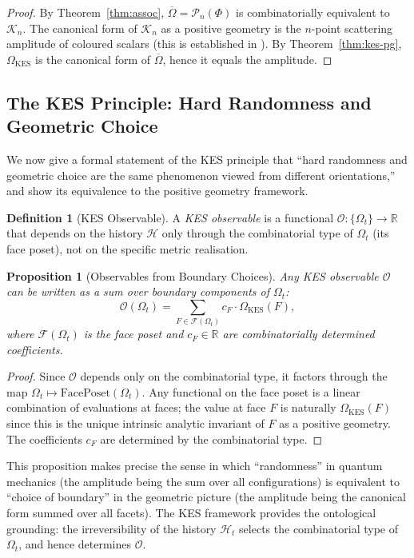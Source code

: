 \documentclass[12pt, oneside]{amsart}
\theoremstyle{plain}
\newtheorem{proposition}[theorem]{Proposition}
\theoremstyle{definition}
\newtheorem{definition}[theorem]{Definition}
\theoremstyle{remark}
\newcommand{\R}{\mathbb{R}}
\newcommand{\OmKS}{\Omega}
\newcommand{\HKS}{\mathcal{H}}
\newcommand{\Assoc}{\mathcal{K}_n}
\newcommand{\CF}{\Omega}   %
\begin{document}
\begin{proof}
By Theorem~\ref{thm:assoc}, $\overline{\OmKS} = \mathcal{P}_n(\Phi)$ is combinatorially equivalent to $\Assoc$. The canonical form of $\Assoc$ as a positive geometry is the $n$-point scattering amplitude of coloured scalars (this is established in \cite{ABHY2018}). By Theorem~\ref{thm:kes-pg}, $\CF_{\text{KES}}$ is the canonical form of $\overline{\OmKS}$, hence it equals the amplitude.
\end{proof}

\subsection{The KES Principle: Hard Randomness and Geometric Choice}

We now give a formal statement of the KES principle that ``hard randomness and geometric choice are the same phenomenon viewed from different orientations,'' and show its equivalence to the positive geometry framework.

\begin{definition}[KES Observable]
\label{def:kes-observable}
A \emph{KES observable} is a functional $\mathcal{O}: \{\OmKS_t\} \to \R$ that depends on the history $\HKS$ only through the combinatorial type of $\OmKS_t$ (its face poset), not on the specific metric realisation.
\end{definition}

\begin{proposition}[Observables from Boundary Choices]
\label{prop:boundary-choice}
Any KES observable $\mathcal{O}$ can be written as a sum over boundary components of $\OmKS_t$:
\[
  \mathcal{O}(\OmKS_t) = \sum_{F \in \mathcal{F}(\OmKS_t)} c_F \cdot \CF_{\text{KES}}(F),
\]
where $\mathcal{F}(\OmKS_t)$ is the face poset and $c_F \in \R$ are combinatorially determined coefficients.
\end{proposition}

\begin{proof}
Since $\mathcal{O}$ depends only on the combinatorial type, it factors through the map $\OmKS_t \mapsto \text{FacePoset}(\OmKS_t)$. Any functional on the face poset is a linear combination of evaluations at faces; the value at face $F$ is naturally $\CF_{\text{KES}}(F)$ since this is the unique intrinsic analytic invariant of $F$ as a positive geometry. The coefficients $c_F$ are determined by the combinatorial type.
\end{proof}

This proposition makes precise the sense in which ``randomness'' in quantum mechanics (the amplitude being the sum over all configurations) is equivalent to ``choice of boundary'' in the geometric picture (the amplitude being the canonical form summed over all facets). The KES framework provides the ontological grounding: the irreversibility of the history $\HKS_t$ selects the combinatorial type of $\OmKS_t$, and hence determines $\mathcal{O}$.
\end{document}

